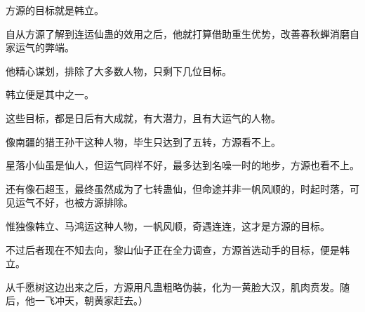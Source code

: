 \begin{this_body}
方源的目标就是韩立。

自从方源了解到连运仙蛊的效用之后，他就打算借助重生优势，改善春秋蝉消磨自家运气的弊端。

他精心谋划，排除了大多数人物，只剩下几位目标。

韩立便是其中之一。

这些目标，都是日后有大成就，有大潜力，且有大运气的人物。

像南疆的猎王孙干这种人物，毕生只达到了五转，方源看不上。

星落小仙虽是仙人，但运气同样不好，最多达到名噪一时的地步，方源也看不上。

还有像石超玉，最终虽然成为了七转蛊仙，但命途并非一帆风顺的，时起时落，可见运气不好，也被方源排除。

惟独像韩立、马鸿运这种人物，一帆风顺，奇遇连连，这才是方源的目标。

不过后者现在不知去向，黎山仙子正在全力调查，方源首选动手的目标，便是韩立。

从千愿树这边出来之后，方源用凡蛊粗略伪装，化为一黄脸大汉，肌肉贲发。随后，他一飞冲天，朝黄家赶去。）

\end{this_body}

